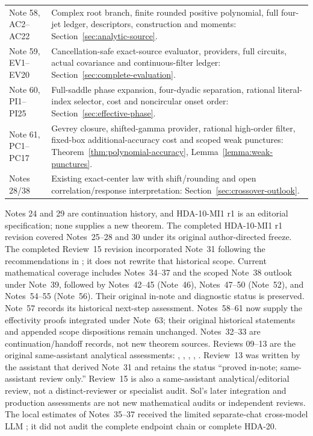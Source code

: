 \begin{longtable}{@{}>{\raggedright\arraybackslash}p{}>{\raggedright\arraybackslash}p{}@{}}
Note 58, AC2--AC22 & Complex root branch, finite rounded positive
polynomial, full four-jet ledger, descriptors, construction and moments:
Section~\ref{sec:analytic-source}.\\
Note 59, EV1--EV20 & Cancellation-safe exact-source evaluator,
providers, full circuits, actual covariance and continuous-filter ledger:
Section~\ref{sec:complete-evaluation}.\\
Note 60, PI1--PI25 & Full-saddle phase expansion, four-dyadic separation,
rational literal-index selector, cost and noncircular onset order:
Section~\ref{sec:effective-phase}.\\
Note 61, PC1--PC17 & Gevrey closure, shifted-gamma provider,
rational high-order filter, fixed-box additional-accuracy cost and
scoped weak punctures: Theorem~\ref{thm:polynomial-accuracy},
Lemma~\ref{lemma:weak-punctures}.\\
Notes 28/38 & Existing exact-center law with shift/rounding and open
correlation/response interpretation: Section~\ref{sec:crossover-outlook}.\\\bottomrule
\end{longtable}\endgroup
Notes 24 and 29 are continuation history, and HDA-10-MI1 r1 is an
editorial specification; none supplies a new theorem. The completed
HDA-10-MI1 r1 revision covered Notes~25--28 and 30 under its original
author-directed freeze. The completed Review~15 revision incorporated
Note~31 \cite{n31} following the recommendations in
;
it does not rewrite that historical scope. Current mathematical coverage
includes Notes~34--37 and the scoped Note~38 outlook under Note~39,
followed by Notes~42--45 (Note~46), Notes~47--50 (Note~52), and
Notes~54--55 (Note~56). Their original in-note and diagnostic status is
preserved. Note~57 records its historical next-step assessment. Notes~58--61
now supply the effectivity proofs integrated under Note~63; their
original historical statements and appended scope dispositions remain
unchanged.
Notes~32--33 are continuation/handoff records, not new theorem sources.
Reviews 09--13 are the original same-assistant
analytical assessments:
,
,
,
,
.
Review~13 was written by the assistant that derived Note~31 and retains
the status ``proved in-note; same-assistant review only.'' Review~15 is
also a same-assistant analytical/editorial review, not a distinct-reviewer
or specialist audit. Sol's later integration and production assessments
are not new mathematical audits or independent reviews. The local estimates
of Notes~35--37 received the limited separate-chat cross-model LLM
;
it did not audit the complete endpoint chain or complete HDA-20.

